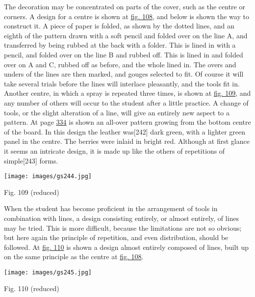 \documentclass[
]{article}
\begin{document}
The decoration may be concentrated on parts of the cover, such as the
centre or corners. A design for a centre is shown at
\protect\hyperlink{Fig_108}{fig. 108}, and below is shown the way to
construct it. A piece of paper is folded, as shown by the dotted lines,
and an eighth of the pattern drawn with a soft pencil and folded over on
the line A, and transferred by being rubbed at the back with a folder.
This is lined in with a pencil, and folded over on the line B and rubbed
off. This is lined in and folded over on A and C, rubbed off as before,
and the whole lined in. The overs and unders of the lines are then
marked, and gouges selected to fit. Of course it will take several
trials before the lines will interlace pleasantly, and the tools fit in.
Another centre, in which a spray is repeated three times, is shown at
\protect\hyperlink{Fig_109}{fig. 109}, and any number of others will
occur to the student after a little practice. A change of tools, or the
slight alteration of a line, will give an entirely new aspect to a
pattern. At page \protect\hyperlink{Page_334}{334} is shown an all-over
pattern growing from the bottom centre of the board. In this design the
leather was{\protect\hypertarget{Page_242}{}{{[}242{]}}} dark green,
with a lighter green panel in the centre. The berries were inlaid in
bright red. Although at first glance it seems an intricate design, it is
made up like the others of repetitions of
simple{\protect\hypertarget{Page_243}{}{{[}243{]}}} forms.

\protect\hypertarget{Fig_109}{}{}
\texttt{[image: images/gs244.jpg]}

Fig. 109 (reduced)

When the student has become proficient in the arrangement of tools in
combination with lines, a design consisting entirely, or almost
entirely, of lines may be tried. This is more difficult, because the
limitations are not so obvious; but here again the principle of
repetition, and even distribution, should be followed. At
\protect\hyperlink{Fig_110}{fig. 110} is shown a design almost entirely
composed of lines, built up on the same principle as the centre at
\protect\hyperlink{Fig_108}{fig. 108}.

\protect\hypertarget{Fig_110}{}{}
\texttt{[image: images/gs245.jpg]}

Fig. 110 (reduced)
\end{document}
